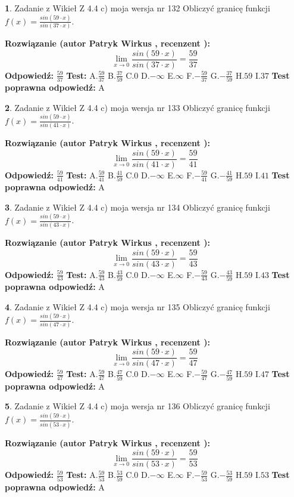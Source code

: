 \documentclass[12pt, a4paper]{article}
\theoremstyle{definition} %
\newtheorem{zad}{}
\newcommand{\zadStart}[1]{\begin{zad}#1\newline}
\newcommand{\zadStop}{\end{zad}}
\newcommand{\rozwStart}[2]{\noindent \textbf{Rozwiązanie (autor #1 , recenzent #2): }\newline}
\newcommand{\rozwStop}{\newline}
\newcommand{\odpStart}{\noindent \textbf{Odpowiedź:}\newline}
\newcommand{\odpStop}{\newline}
\newcommand{\testStart}{\noindent \textbf{Test:}\newline}
\newcommand{\testStop}{\newline}
\newcommand{\kluczStart}{\noindent \textbf{Test poprawna odpowiedź:}\newline}
\newcommand{\kluczStop}{\newline}
\begin{document}
\zadStart{Zadanie z Wikieł Z 4.4 c) moja wersja nr 132}
Obliczyć granicę funkcji $f(x)=\frac{sin(59\cdot x)}{sin(37\cdot x)}$.
\zadStop
\rozwStart{Patryk Wirkus}{}
$$\lim\limits_{x\to 0}\frac{sin(59\cdot x)}{sin(37\cdot x)}=
\frac{59}{37}$$
\rozwStop
\odpStart
$\frac{59}{37}$
\odpStop
\testStart
A.$\frac{59}{37}$
B.$\frac{37}{59}$
C.$0$
D.$-\infty$
E.$\infty$
F.$-\frac{59}{37}$
G.$-\frac{37}{59}$
H.$59$
I.$37$
\testStop
\kluczStart
A
\kluczStop



\zadStart{Zadanie z Wikieł Z 4.4 c) moja wersja nr 133}
Obliczyć granicę funkcji $f(x)=\frac{sin(59\cdot x)}{sin(41\cdot x)}$.
\zadStop
\rozwStart{Patryk Wirkus}{}
$$\lim\limits_{x\to 0}\frac{sin(59\cdot x)}{sin(41\cdot x)}=
\frac{59}{41}$$
\rozwStop
\odpStart
$\frac{59}{41}$
\odpStop
\testStart
A.$\frac{59}{41}$
B.$\frac{41}{59}$
C.$0$
D.$-\infty$
E.$\infty$
F.$-\frac{59}{41}$
G.$-\frac{41}{59}$
H.$59$
I.$41$
\testStop
\kluczStart
A
\kluczStop



\zadStart{Zadanie z Wikieł Z 4.4 c) moja wersja nr 134}
Obliczyć granicę funkcji $f(x)=\frac{sin(59\cdot x)}{sin(43\cdot x)}$.
\zadStop
\rozwStart{Patryk Wirkus}{}
$$\lim\limits_{x\to 0}\frac{sin(59\cdot x)}{sin(43\cdot x)}=
\frac{59}{43}$$
\rozwStop
\odpStart
$\frac{59}{43}$
\odpStop
\testStart
A.$\frac{59}{43}$
B.$\frac{43}{59}$
C.$0$
D.$-\infty$
E.$\infty$
F.$-\frac{59}{43}$
G.$-\frac{43}{59}$
H.$59$
I.$43$
\testStop
\kluczStart
A
\kluczStop



\zadStart{Zadanie z Wikieł Z 4.4 c) moja wersja nr 135}
Obliczyć granicę funkcji $f(x)=\frac{sin(59\cdot x)}{sin(47\cdot x)}$.
\zadStop
\rozwStart{Patryk Wirkus}{}
$$\lim\limits_{x\to 0}\frac{sin(59\cdot x)}{sin(47\cdot x)}=
\frac{59}{47}$$
\rozwStop
\odpStart
$\frac{59}{47}$
\odpStop
\testStart
A.$\frac{59}{47}$
B.$\frac{47}{59}$
C.$0$
D.$-\infty$
E.$\infty$
F.$-\frac{59}{47}$
G.$-\frac{47}{59}$
H.$59$
I.$47$
\testStop
\kluczStart
A
\kluczStop



\zadStart{Zadanie z Wikieł Z 4.4 c) moja wersja nr 136}
Obliczyć granicę funkcji $f(x)=\frac{sin(59\cdot x)}{sin(53\cdot x)}$.
\zadStop
\rozwStart{Patryk Wirkus}{}
$$\lim\limits_{x\to 0}\frac{sin(59\cdot x)}{sin(53\cdot x)}=
\frac{59}{53}$$
\rozwStop
\odpStart
$\frac{59}{53}$
\odpStop
\testStart
A.$\frac{59}{53}$
B.$\frac{53}{59}$
C.$0$
D.$-\infty$
E.$\infty$
F.$-\frac{59}{53}$
G.$-\frac{53}{59}$
H.$59$
I.$53$
\testStop
\kluczStart
A
\kluczStop
\end{document}
